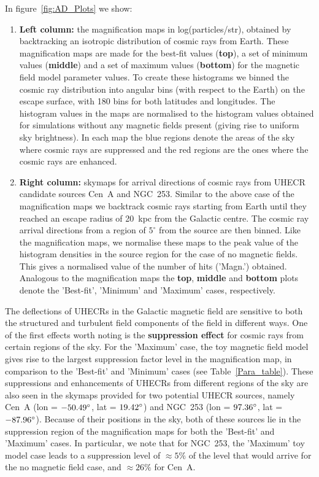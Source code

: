 \documentclass[usenatbib]{mnras}
\begin{document}
In figure~\ref{fig:AD_Plots} we show:

\begin{enumerate}
    \item {\bf Left column: } the magnification maps in log(particles/str), obtained by backtracking an isotropic distribution of cosmic rays from Earth. These magnification maps are made for the best-fit values (\textbf{top}), a set of minimum values (\textbf{middle}) and a set of maximum values (\textbf{bottom}) for the magnetic field model parameter values.
    To create these histograms we binned the cosmic ray distribution into angular bins (with respect to the Earth) on the escape surface, with 180 bins for both latitudes and longitudes. The histogram values in the maps are normalised to the histogram values obtained for simulations without any magnetic fields present (giving rise to uniform sky brightness). In each map the blue regions denote the areas of the sky where cosmic rays are suppressed and the red regions are the ones where the cosmic rays are enhanced.
    
    \item {\bf Right column: } skymaps for arrival directions
    of cosmic rays from UHECR candidate sources Cen~A and NGC~253. Similar to the above case of the magnification maps we backtrack cosmic rays starting from Earth until they reached an escape radius of 20~kpc from the Galactic centre. The cosmic ray arrival directions from a region of $5^{\circ}$ from the source are then binned.  Like the magnification maps, we normalise these maps to the peak value of the histogram densities in the source region for the case of no magnetic fields.  This gives a normalised value of the number of hits ('Magn.') obtained. Analogous to the magnification maps the \textbf{top}, \textbf{middle} and \textbf{bottom} plots denote the 'Best-fit', 'Minimum' and 'Maximum' cases, respectively. 
    \end{enumerate}

The deflections of UHECRs in the Galactic magnetic field are sensitive to both the structured and turbulent field components of the field in different ways. One of the first effects worth noting is the {\bf suppression effect} for cosmic rays from certain regions of the sky. For the 'Maximum' case, the toy magnetic field model gives rise to the largest suppression factor level in the magnification map, in comparison to the 'Best-fit' and 'Minimum' cases (see Table~\ref{Para_table}). These suppressions and enhancements of UHECRs from different regions of the sky are also seen in the skymaps provided for two potential UHECR sources, namely Cen~A (lon = $\rm -50.49^{\circ}$, lat = $\rm 19.42^{\circ}$) and NGC~253 (lon = $\rm 97.36^{\circ}$, lat = $\rm -87.96^{\circ}$). Because of their positions in the sky, both of these sources lie in the suppression region of the magnification maps for both the 'Best-fit' and 'Maximum' cases. In particular, we note that for NGC~253, the 'Maximum' toy model case leads to a suppression level of $\approx 5\%$ of the level that would arrive for the no magnetic field case, and $\approx 26\%$ for Cen~A.
\end{document}
